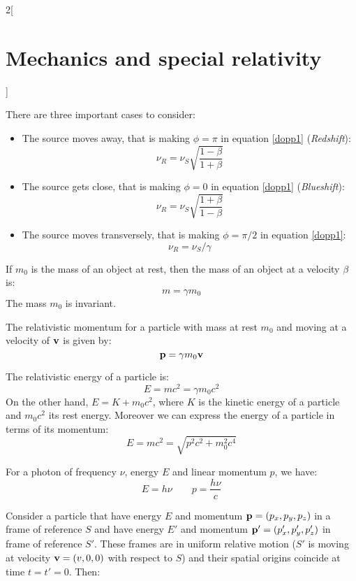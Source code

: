 \documentclass[../../../main.tex]{subfiles}
\begin{document}
\begin{multicols}{2}[\section{Mechanics and special relativity}]
\begin{center}
\begin{minipage}{\linewidth}
    \end{minipage}
  \end{center}
  \begin{corollary}
    There are three important cases to consider:
    \begin{itemize}
      \item The source moves away, that is making $\phi=\pi$ in equation \eqref{dopp1} (\textit{Redshift}):
            $$\nu_R=\nu_S\sqrt{\frac{1-\beta}{1+\beta}}$$
      \item The source gets close, that is making $\phi=0$ in equation \eqref{dopp1} (\textit{Blueshift}):
            $$\nu_R=\nu_S\sqrt{\frac{1+\beta}{1-\beta}}$$
      \item The source moves transversely, that is making $\phi=\pi/2$ in equation \eqref{dopp1}:$$\nu_R=\nu_S/\gamma$$
    \end{itemize}
  \end{corollary}
  \begin{prop}
    If $m_0$ is the mass of an object at rest, then the mass of an object at a velocity $\beta$ is: $$m=\gamma m_0$$ The mass $m_0$ is invariant.
  \end{prop}
  \begin{prop}
    The relativistic momentum for a particle with mass at rest $m_0$ and moving at a velocity of $\vb{v}$ is given by: $$\vb{p}=\gamma m_0\vb{v}$$
  \end{prop}
  \begin{prop}
    The relativistic energy of a particle is: $$E=mc^2=\gamma m_0c^2$$ On the other hand, $E=K+m_0c^2$, where $K$ is the kinetic energy of a particle and $m_0c^2$ its rest energy. Moreover we can express the energy of a particle in terms of its momentum:
    $$E=mc^2=\sqrt{p^2c^2+m_0^2c^4}$$
  \end{prop}
  \begin{prop}
    For a photon of frequency $\nu$, energy $E$ and linear momentum $p$, we have:
    $$E=h\nu\qquad p=\frac{h\nu}{c}$$
  \end{prop}
  \begin{prop}
    Consider a particle that have energy $E$ and momentum $\vb{p}=(p_x,p_y,p_z)$ in a frame of reference $S$ and have energy $E'$ and momentum $\vb{p}'=(p_x',p_y',p_z')$ in frame of reference $S'$. These frames are in uniform relative motion ($S'$ is moving at velocity $\vb{v}=(v,0,0)$ with respect to $S$) and their spatial origins coincide at time $t=t'=0$. Then:

\end{prop}
\end{multicols}
\end{document}
